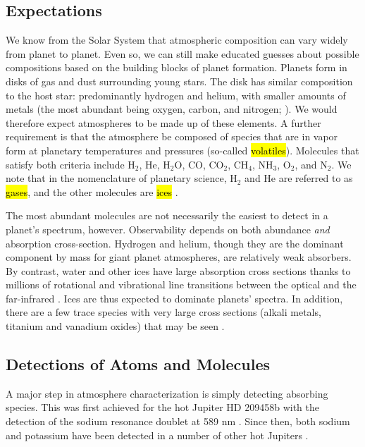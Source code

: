 \documentclass[graybox,natbib,nosecnum]{svmult}
\newcommand{\hbindex}[1]{\hl{#1}\index{#1}}  %
\begin{document}
\subsection{Expectations}
We know from the Solar System that atmospheric composition can vary widely from planet to planet. Even so, we can still make educated guesses about possible compositions based on the building blocks of planet formation.  Planets form in disks of gas and dust surrounding young stars.  The disk has similar composition to the host star: predominantly hydrogen and helium, with smaller amounts of metals (the most abundant being oxygen, carbon, and nitrogen; \citealt{anders89}).  We would therefore expect atmospheres to be made up of these elements.  A further requirement is that the atmosphere be composed of species that are in vapor form at planetary temperatures and pressures (so-called \hbindex{volatiles}).  Molecules that satisfy both criteria include H$_2$, He, H$_2$O, CO, CO$_2$, CH$_4$, NH$_3$, O$_2$, and N$_2$.  We note that in the nomenclature of planetary science, H$_2$ and He are referred to as \hbindex{gases}, and the other molecules are \hbindex{ices} \citep{depater15}.

The most abundant molecules are not necessarily the easiest to detect in a planet's spectrum, however. Observability depends on both abundance \emph{and} absorption cross-section. Hydrogen and helium, though they are the dominant component by mass for giant planet atmospheres, are relatively weak absorbers. By contrast, water and other ices have large absorption cross sections thanks to millions of rotational and vibrational line transitions between the optical and the far-infrared \citep{tennyson12}.  Ices are thus expected to dominate planets' spectra.  In addition, there are a few trace species with very large cross sections (alkali metals, titanium and vanadium oxides) that may be seen \citep{seager00, fortney08}.

\subsection{Detections of Atoms and Molecules}
A major step in atmosphere characterization is simply detecting absorbing species. This was first achieved for the hot Jupiter HD 209458b with the detection of the sodium resonance doublet at 589 nm \citep{charbonneau02}. Since then, both sodium and potassium have been detected in a number of other hot Jupiters \citep[e.g.][]{sing11b, jensen11, nikolov14, fischer16}.
\end{document}
